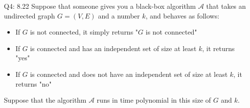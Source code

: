 \begin{problem}
    {Q4: 8.22}
    Suppose that someone gives you a black-box algorithm $\mathcal{A}$ that takes an undirected graph $G = (V,E)$ and a number $k$, and behaves as
    follows:
    \begin{itemize}
      \item If $G$ is not connected, it simply returns "$G$ is not connected"
      \item If $G$ is connected and has an independent set of size at least $k$, it returns "yes"
      \item If $G$ is connected and does not have an independent set of size at least $k$, it returns "no"
    \end{itemize}
    Suppose that the algorithm $\mathcal{A}$ runs in time polynomial in this size of $G$ and $k$.


\end{problem}
